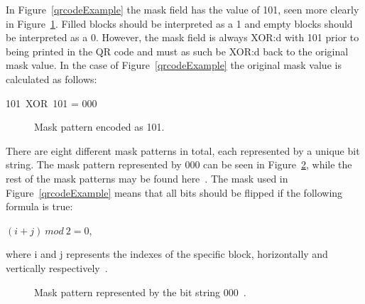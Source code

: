 In Figure~\ref{qrcodeExample} the mask field has the value of 101, seen more clearly in Figure~\ref{qrcodeExampleStep3}. Filled blocks should be interpreted as a 1 and empty blocks should be interpreted as a 0. However, the mask field is always XOR:d with 101 prior to being printed in the QR code and must as such be XOR:d back to the original mask value. In the case of Figure~\ref{qrcodeExample} the original mask value is calculated as follows:

\begin{center}
	101~XOR~101 = 000
\end{center}

	\begin{figure}[H]%
		\centering
		\caption{Mask pattern encoded as 101.}
		\label{qrcodeExampleStep3}
	\end{figure}

There are eight different mask patterns in total, each represented by a unique bit string. The mask pattern represented by 000 can be seen in Figure~\ref{qrcodemaskpattern}, while the rest of the mask patterns may be found here~\cite{qrcodeMaskPatterns}. The mask used in Figure~\ref{qrcodeExample} means that all bits should be flipped if the following formula is true:

\begin{center}
	\((i+j)~mod~2=0\), 

	where i and j represents the indexes of the specific block, horizontally and vertically respectively~\cite{qrcodeMaskPatterns}.
\end{center}

	\begin{figure}[H]%
		\centering
		\caption{Mask pattern represented by the bit string 000~\cite{qrcodeMaskPatterns}.}
		\label{qrcodemaskpattern}
	\end{figure}
	

